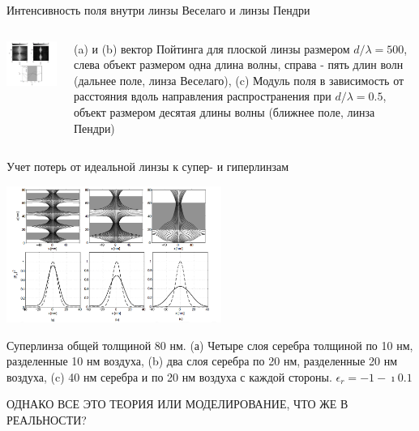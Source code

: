 \documentclass[9pt, compress, xcolor=table]{beamer}
\begin{document}
\begin{frame}{Интенсивность поля внутри линзы Веселаго и линзы Пендри}

\begin{columns}[c]

\column{8cm}
\begin{center}
\includegraphics[width=8cm]{neg_ref_40d}
\end{center}

\column{4cm} {\tiny (a) и (b) вектор Пойтинга для плоской линзы размером $d/\lambda = 500$, слева
объект размером одна длина волны, справа - пять длин волн (дальнее поле, линза Веселаго), (c)
Модуль поля в зависимость от расстояния вдоль направления распространения при $d/\lambda = 0.5$,
объект размером десятая длины волны (ближнее поле, линза Пендри)}
\end{columns}
\end{frame}


\begin{frame}{Учет потерь от идеальной линзы к супер- и гиперлинзам}
\begin{center}
\includegraphics[width=7cm]{neg_ref_40f}
\end{center}

{\scriptsize Суперлинза общей толщиной $80$ нм. (а) Четыре слоя серебра толщиной по 10 нм,
разделенные 10 нм воздуха, (b) два слоя серебра по 20 нм, разделенные 20 нм воздуха, (c) 40 нм
серебра и по 20 нм воздуха с каждой стороны. $\epsilon_r = -1-\imath 0.1$}

ОДНАКО ВСЕ ЭТО ТЕОРИЯ ИЛИ МОДЕЛИРОВАНИЕ, ЧТО ЖЕ В РЕАЛЬНОСТИ?

\end{frame}
\end{document}
